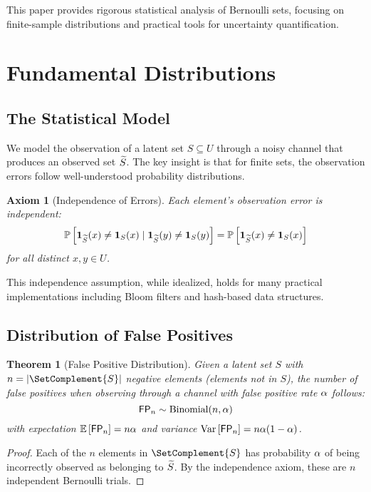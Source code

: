 \documentclass[11pt,final,hidelinks]{article}
\newtheorem{theorem}{Theorem}[section]
\newtheorem{axiom}{Axiom}
\newcommand{\SetIndicator}[1]{\mathbf{1}_{#1}}
\newcommand{\FP}{\mathsf{FP}}  %
\newcommand{\Binomial}[2]{\mathrm{Binomial}(#1, #2)}
\begin{document}
This paper provides rigorous statistical analysis of Bernoulli sets, focusing on finite-sample distributions and practical tools for uncertainty quantification.

\section{Fundamental Distributions}

\subsection{The Statistical Model}

We model the observation of a latent set $S \subseteq U$ through a noisy channel that produces an observed set $\widetilde{S}$. The key insight is that for finite sets, the observation errors follow well-understood probability distributions.

\begin{axiom}[Independence of Errors]
Each element's observation error is independent:
\begin{equation}
\ProbCond{\SetIndicator{\obs{S}}(x) \neq \SetIndicator{S}(x)}{\SetIndicator{\obs{S}}(y) \neq \SetIndicator{S}(y)} = 
\Prob{\SetIndicator{\obs{S}}(x) \neq \SetIndicator{S}(x)}
\end{equation}
for all distinct $x, y \in U$.
\end{axiom}

This independence assumption, while idealized, holds for many practical implementations including Bloom filters and hash-based data structures.

\subsection{Distribution of False Positives}

\begin{theorem}[False Positive Distribution]
\label{thm:fp-dist}
Given a latent set $S$ with $n = \Card{\SetComplement{S}}$ negative elements (elements not in $S$), the number of false positives when observing through a channel with false positive rate $\alpha$ follows:
\begin{equation}
\FP_n \sim \Binomial{n}{\fprate}
\end{equation}
with expectation $\Expect{\FP_n} = n\fprate$ and variance $\Var{\FP_n} = n\fprate(1-\fprate)$.
\end{theorem}

\begin{proof}
Each of the $n$ elements in $\SetComplement{S}$ has probability $\alpha$ of being incorrectly observed as belonging to $\widetilde{S}$. By the independence axiom, these are $n$ independent Bernoulli trials.
\end{proof}
\end{document}
